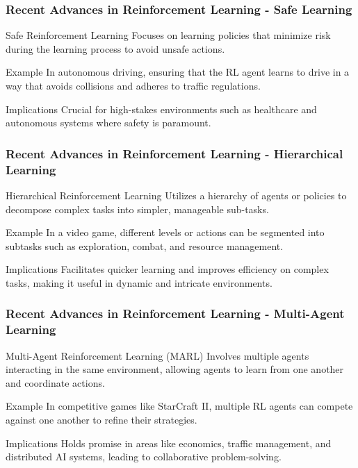 \documentclass[aspectratio=169]{beamer}
\begin{document}
\begin{frame}[fragile]
    \frametitle{Recent Advances in Reinforcement Learning - Safe Learning}
    \begin{block}{Safe Reinforcement Learning}
        Focuses on learning policies that minimize risk during the learning process to avoid unsafe actions.
    \end{block}
    \begin{exampleblock}{Example}
        In autonomous driving, ensuring that the RL agent learns to drive in a way that avoids collisions and adheres to traffic regulations.
    \end{exampleblock}
    \begin{block}{Implications}
        Crucial for high-stakes environments such as healthcare and autonomous systems where safety is paramount.
    \end{block}
\end{frame}

\begin{frame}[fragile]
    \frametitle{Recent Advances in Reinforcement Learning - Hierarchical Learning}
    \begin{block}{Hierarchical Reinforcement Learning}
        Utilizes a hierarchy of agents or policies to decompose complex tasks into simpler, manageable sub-tasks.
    \end{block}
    \begin{exampleblock}{Example}
        In a video game, different levels or actions can be segmented into subtasks such as exploration, combat, and resource management.
    \end{exampleblock}
    \begin{block}{Implications}
        Facilitates quicker learning and improves efficiency on complex tasks, making it useful in dynamic and intricate environments.
    \end{block}
\end{frame}

\begin{frame}[fragile]
    \frametitle{Recent Advances in Reinforcement Learning - Multi-Agent Learning}
    \begin{block}{Multi-Agent Reinforcement Learning (MARL)}
        Involves multiple agents interacting in the same environment, allowing agents to learn from one another and coordinate actions.
    \end{block}
    \begin{exampleblock}{Example}
        In competitive games like StarCraft II, multiple RL agents can compete against one another to refine their strategies.
    \end{exampleblock}
    \begin{block}{Implications}
        Holds promise in areas like economics, traffic management, and distributed AI systems, leading to collaborative problem-solving.
    \end{block}
\end{frame}
\end{document}
